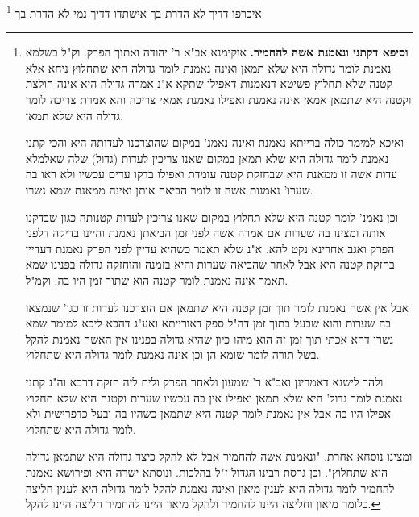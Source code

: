 \documentclass[12pt, openany]{book}
\newcommand{\footnotecomment}[1]{\footnote{#1}}
\newcommand{\commenta}[1]{\footnotecomment{#1}}
\begin{document}
{איכרפו דדיך לא הדרת בך אישתדו דדיך נמי לא הדרת בך 
\commenta{\textbf{וסיפא דקתני ונאמנת אשה להחמיר.}  אוקימנא אב"א ר' יהודה ואתוך הפרק. וק"ל בשלמא נאמנת לומר גדולה היא שלא תמאן ואינה נאמנת לומר גדולה היא שתחלוץ ניחא אלא קטנה שלא תחלוץ פשיטא דנאמנות דאפילו שתקא א"נ אמרה גדולה היא אינה חולצת וקטנה היא שתמאן אמאי אינה נאמנת ואפילו נאמנת אמאי צריכה והא אמרת צריכה לומר גדולה היא שלא תמאן.\par  ואיכא למימר כולה ברייתא נאמנת ואינה נאמנ' במקום שהוצרכנו לעדותה היא והכי קתני נאמנת לומר גדולה היא שלא תמאן במקום שאנו צריכין לעדות (גדול) שלה שאלמלא עדות אשה זו ממאנת היא שבחזקת קטנה עומדת ואפילו בדקו עדים עכשיו ולא ראו בה שערו' נאמנות אשה זו לומר הביאה אותן ואינה ממאנת שמא נשרו.\par וכן נאמנ' לומר קטנה היא שלא תחלוץ במקום שאנו צריכין לעדות קטנותה כגון שבדקנו אותה ומצינו בה שערות אם אמרה אשה לפני זמן הביאתן נאמנת והיינו בדיקה דלפני הפרק ואגב אחרינא נקט להא. א"נ שלא תאמר כשהיא עדיין לפני הפרק נאמנת דעדיין בחזקת קטנה היא אבל לאחר שהביאה שערות והיא בזמנה והוחזקה גדולה בפנינו שמא תאמר אינה נאמנת לומר קטנה הוא שתוך זמן היו בה. וקמ"ל.\par אבל אין אשה נאמנת לומר תוך זמן קטנה היא שתמאן אם הוצרכנו לעדות זו כגו' שנמצאו בה שערות והוא שבעל בתוך זמן דה"ל ספק דאורייתא ואע"ג דהכא ליכא למימר שמא נשרו דהא אכתי תוך זמן זה הוא מיהו כיון שהיא גדולה בפנינו אין האשה נאמנת להקל בשל תורה לומר שומא הן וכן אינה נאמנת לומר גדולה היא שתחלוץ.\par  ולהך לישנא דאמרינן ואב"א ר' שמעון ולאחר הפרק ולית ליה חזקה דרבא וה"נ קתני נאמנת לומר גדול' היא שלא תמאן ואפילו אין בה עכשיו שערות וקטנה היא שלא תחלוץ אפילו היו בה אבל אין נאמנת לומר קטנה היא שתמאן כשהיו בה ובעל כדפרישית ולא לומר גדולה היא שתחלוץ.\par  ומצינו נוסחא אחרת. "ונאמנת אשה להחמיר אבל לא להקל כיצד גדולה היא שתמאן גדולה היא שתחלוץ". וכן גרסת רבינו הגדול ז"ל בהלכות. ונוסתא ישרה היא ופירושא נאמנת להחמיר לומר גדולה היא לענין מיאון ואינה נאמנת להקל לומר גדולה היא לענין חליצה כלומר מיאון וחליצה היינו להחמיר ולהקל מיאון היינו להחמיר חליצה היינו להקל. }

}
\end{document}
